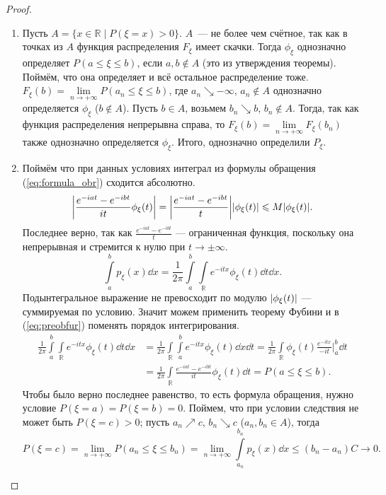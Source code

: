     \begin{proof}
    \enewline
    \begin{enumerate}
        \item Пусть $A= \{x\in\mathbb{R}\mid P(\xi = x) > 0\}$. $A$~--- не более чем счётное, так как в точках из $A$ функция распределения $F_\xi$ имеет скачки.
                       Тогда $\phi_\xi$ однозначно определяет $P(a\le\xi\le b)$, если $a, b\notin A$ (это из утверждения теоремы). Поймём, что она определяет и всё остальное распределение тоже.
                       $F_\xi(b) = \underset{n\rightarrow+\infty}{\lim} P(a_n\le\xi\le b)$,
                       где $a_n \searrow -\infty$, $a_n\notin A$ однозначно определяется $\phi_\xi$ ($b \notin A$).
                       Пусть $b\in A$, возьмем $b_n \searrow b$, $b_n \notin A$. Тогда, так как функция распределения непрерывна справа, то $F_\xi(b) = \underset{n\rightarrow+\infty}{\lim} F_\xi(b_n)$ также однозначно определяется $\phi_\xi$.
                       Итого, однозначно определили $P_\xi$.
        \item Поймём что при данных условиях интеграл из формулы обращения (\ref{eq:formula_obr}) сходится абсолютно. 
                   $$\abs*{\frac{e^{-iat} - e^{-ibt}}{it}\phi_\xi(t)} = \abs*{\frac{e^{-iat} - e^{-ibt}}{t}}\abs{\phi_\xi(t)} \le M\abs{\phi_\xi(t)}.$$
                      Последнее верно, так как $\frac{e^{-iat} - e^{-ibt}}{t}$ --- ограниченная функция, поскольку она непрерывная и стремится к нулю при $t \to \pm\infty$.
    \begin{equation*}\label{eq:preobfur} \tag{$\spadesuit$}
        \int\limits_a^b p_\xi(x)\dd x = \frac{1}{2\pi}\int\limits_a^b\int\limits_\mathbb{R}e^{-itx}\phi_\xi(t)\dd t\dd x.
    \end{equation*}
        Подынтегральное выражение не превосходит по модулю $\lvert\phi_\xi(t)\rvert$ --- суммируемая по условию. Значит можем применить теорему Фубини и в (\ref{eq:preobfur}) поменять порядок интегрирования.
        \begin{align*}
            \frac{1}{2\pi}\int\limits_a^b\int\limits_\mathbb{R}e^{-itx}\phi_\xi(t)\dd t\dd x &= \frac{1}{2\pi}\int\limits_\mathbb{R}\int\limits_a^b e^{-itx}\phi_\xi(t)\dd x\dd t = \frac{1}{2\pi}\int\limits_\mathbb{R}\phi_\xi(t) \frac{e^{-itx}}{-it}\Bigg|_a^b\dd t \\&=\frac{1}{2\pi}\int\limits_\mathbb{R}\frac{e^{-iat} - e^{-ibt}}{it}\phi_\xi(t)\dd t = P(a\le\xi\le b).
        \end{align*}
         Чтобы было верно последнее равенство, то есть формула обращения, нужно условие $P(\xi = a) = P(\xi = b) =0$. Поймем, что при условии следствия не может быть $P(\xi = c) > 0$; пусть $a_n\nearrow c$, $b_n\searrow c$ ($a_n, b_n \in A$), тогда
                       $$P(\xi = c) = \lim\limits_{n \to +\infty} P(a_n \le \xi\le b_n)  =
                           \lim\limits_{n \to +\infty} \int\limits_{a_n}^{b_n}p_\xi(x)\dd x \le (b_n-a_n)C \rightarrow 0.$$ \qedhere
    \end{enumerate}
    \end{proof}
    
